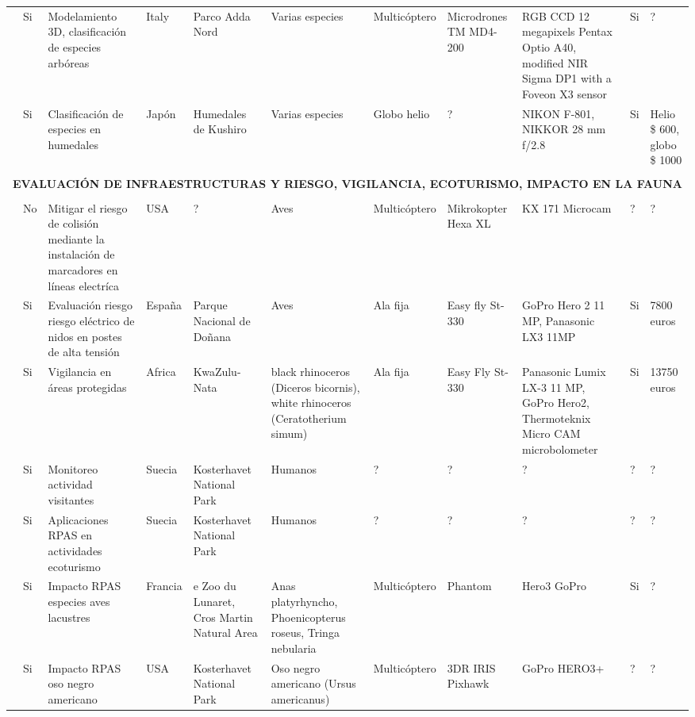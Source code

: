 \documentclass[onecolumn]{extarticle}
\begin{document}
\begin{landscape}
\begin{table}
\begin{tabular}{p{3cm}p{1.2cm}p{3cm}p{1cm}p{2cm}p{2cm}p{1cm}p{2cm}p{2cm}p{1cm}p{2cm}}
\cite{Gini2012}  & Si & Modelamiento 3D, clasificación de especies arbóreas & Italy & Parco Adda Nord &  Varias especies &  Multicóptero  &  Microdrones TM MD4-200 & RGB CCD 12 megapixels Pentax Optio A40, modified NIR Sigma DP1 with a Foveon X3 sensor  & Si & ?  \\

\cite{Miyamoto2004}& Si & Clasificación de especies en humedales & Japón & Humedales de Kushiro &  Varias especies & Globo helio  & ? & NIKON F-801, NIKKOR 28 mm f/2.8  & Si & Helio \$ 600, globo \$ 1000  \\ 

\multicolumn{11}{c}{} \\
\multicolumn{11}{c}{{\bf EVALUACIÓN DE INFRAESTRUCTURAS Y RIESGO, VIGILANCIA, ECOTURISMO, IMPACTO EN LA FAUNA }} \\
\multicolumn{11}{c}{} \\

\cite{Lobermeier2015} & No  & Mitigar el riesgo de colisión mediante la instalación de marcadores en líneas electríca & USA & ?  & Aves  & Multicóptero  & Mikrokopter Hexa XL  & KX 171 Microcam & ? & ? \\ 

\cite{Mulero-Pazmany2014a} & Si  & Evaluación riesgo riesgo eléctrico de nidos en postes de alta tensión & España & Parque Nacional de Doñana &  Aves  & Ala fija  & Easy fly St-330 & GoPro Hero 2 11 MP, Panasonic LX3 11MP & Si & 7800 euros  \\ 

\cite{Mulero-Pazmany2014}  & Si  & Vigilancia en áreas protegidas & Africa & KwaZulu-Nata & black rhinoceros (Diceros bicornis), white rhinoceros (Ceratotherium simum)  & Ala fija  & Easy Fly St-330 & Panasonic Lumix LX-3 11 MP, GoPro Hero2, Thermoteknix Micro CAM microbolometer & Si & 13750 euros  \\ 

\cite{Hansen2016} & Si  & Monitoreo actividad visitantes  & Suecia & Kosterhavet National Park &  Humanos  & ?  & ? & ?  & ? & ?  \\ 

\cite{King2014} & Si  & Aplicaciones RPAS en actividades ecoturismo & Suecia & Kosterhavet National Park &  Humanos  & ?  & ? & ?  & ? & ?  \\ 
  
\cite{Vas2015} & Si  & Impacto RPAS  especies aves lacustres  & Francia & e Zoo du Lunaret, Cros Martin Natural Area &  Anas platyrhyncho, Phoenicopterus roseus, Tringa nebularia  & Multicóptero &  Phantom & Hero3 GoPro & Si  & ?  \\ 

\cite{Ditmer2015} & Si  & Impacto  RPAS oso negro americano   & USA & Kosterhavet National Park &  Oso negro americano (Ursus americanus) & Multicóptero & 3DR IRIS Pixhawk & GoPro HERO3+ & ?  & ?  \\ 

\end{tabular}
\end{table}
\end{landscape}
\end{document}

